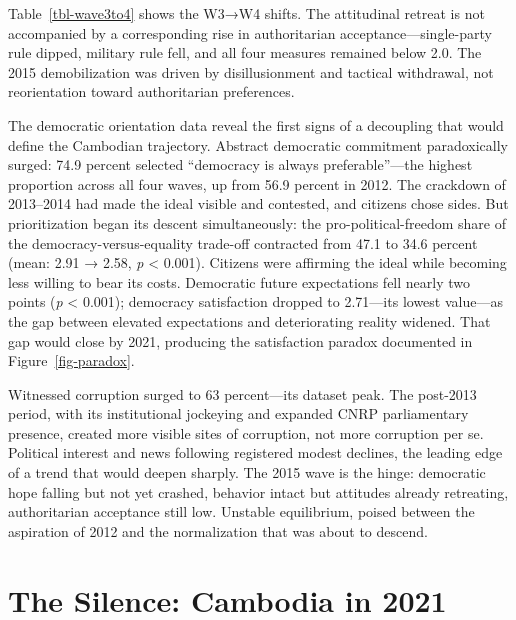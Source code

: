 \documentclass[Review,times,sageh,doublespace]{sagej}
\begin{document}
Table~\ref{tbl-wave3to4} shows the W3→W4 shifts. The attitudinal retreat
is not accompanied by a corresponding rise in authoritarian
acceptance---single-party rule dipped, military rule fell, and all four
measures remained below 2.0. The 2015 demobilization was driven by
disillusionment and tactical withdrawal, not reorientation toward
authoritarian preferences.

The democratic orientation data reveal the first signs of a decoupling
that would define the Cambodian trajectory. Abstract democratic
commitment paradoxically surged: 74.9 percent selected ``democracy is
always preferable''---the highest proportion across all four waves, up
from 56.9 percent in 2012. The crackdown of 2013--2014 had made the
ideal visible and contested, and citizens chose sides. But
prioritization began its descent simultaneously: the
pro-political-freedom share of the democracy-versus-equality trade-off
contracted from 47.1 to 34.6 percent (mean: 2.91 → 2.58, \emph{p}
\textless{} 0.001). Citizens were affirming the ideal while becoming
less willing to bear its costs. Democratic future expectations fell
nearly two points (\emph{p} \textless{} 0.001); democracy satisfaction
dropped to 2.71---its lowest value---as the gap between elevated
expectations and deteriorating reality widened. That gap would close by
2021, producing the satisfaction paradox documented in
Figure~\ref{fig-paradox}.

Witnessed corruption surged to 63 percent---its dataset peak. The
post-2013 period, with its institutional jockeying and expanded CNRP
parliamentary presence, created more visible sites of corruption, not
more corruption per se. Political interest and news following registered
modest declines, the leading edge of a trend that would deepen sharply.
The 2015 wave is the hinge: democratic hope falling but not yet crashed,
behavior intact but attitudes already retreating, authoritarian
acceptance still low. Unstable equilibrium, poised between the
aspiration of 2012 and the normalization that was about to descend.

\section{The Silence: Cambodia in
2021}\label{the-silence-cambodia-in-2021}
\end{document}
